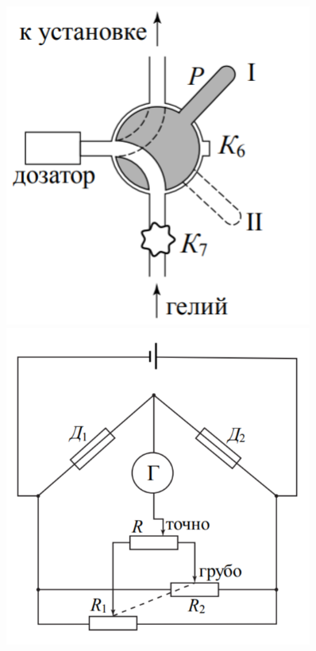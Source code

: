 \documentclass[a4paper,12pt]{article}
\begin{document}
         \begin{figure}[h!]
            \centering
            \begin{minipage}[t]{0.45\textwidth}
                \centering
                \includegraphics[width=0.9\textwidth]{dozator.png}
                \caption{}
                \label{fig:doser}
            \end{minipage}
            \hfill
            \begin{minipage}[t]{0.45\textwidth}
                \centering
                \includegraphics[width=0.9\textwidth]{cep.png}
                \caption{}
                \label{fig:bridge}
            \end{minipage}
        \end{figure}
\end{document}
